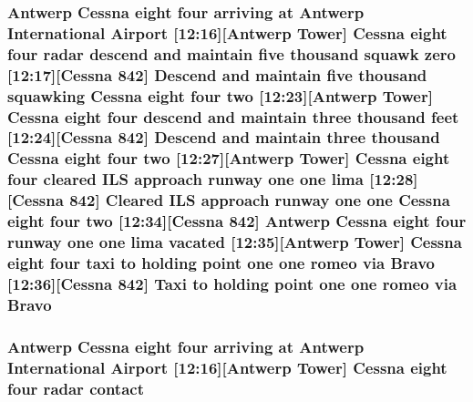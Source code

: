 \subsubsection[{\texorpdfstring{Bravo}{Bravo}}]{\setlength{\rightskip}{0pt plus 5cm}Antwerp {\bf Cessna} eight four arriving at Antwerp International {\bf Airport} \mbox{[}12\+:16\mbox{]}\mbox{[}Antwerp {\bf Tower}\mbox{]} {\bf Cessna} eight four radar descend and maintain five {\bf thousand} squawk {\bf zero} \mbox{[}12\+:17\mbox{]}\mbox{[}{\bf Cessna} 842\mbox{]} Descend and maintain five {\bf thousand} {\bf squawking} {\bf Cessna} eight four {\bf two} \mbox{[}12\+:23\mbox{]}\mbox{[}Antwerp {\bf Tower}\mbox{]} {\bf Cessna} eight four descend and maintain three {\bf thousand} {\bf feet} \mbox{[}12\+:24\mbox{]}\mbox{[}{\bf Cessna} 842\mbox{]} Descend and maintain three {\bf thousand} {\bf Cessna} eight four {\bf two} \mbox{[}12\+:27\mbox{]}\mbox{[}Antwerp {\bf Tower}\mbox{]} {\bf Cessna} eight four cleared I\+LS approach runway {\bf one} {\bf one} {\bf lima} \mbox{[}12\+:28\mbox{]}\mbox{[}{\bf Cessna} 842\mbox{]} Cleared I\+LS approach runway {\bf one} {\bf one} {\bf Cessna} eight four {\bf two} \mbox{[}12\+:34\mbox{]}\mbox{[}{\bf Cessna} 842\mbox{]} Antwerp {\bf Cessna} eight four runway {\bf one} {\bf one} {\bf lima} vacated \mbox{[}12\+:35\mbox{]}\mbox{[}Antwerp {\bf Tower}\mbox{]} {\bf Cessna} eight four taxi to holding point {\bf one} {\bf one} {\bf romeo} via Bravo \mbox{[}12\+:36\mbox{]}\mbox{[}{\bf Cessna} 842\mbox{]} Taxi to holding point {\bf one} {\bf one} {\bf romeo} via Bravo}\hypertarget{happyDay2ATC_8txt_acb3d304c3ed17a69007f1a5f35b55c6f}{}\label{happyDay2ATC_8txt_acb3d304c3ed17a69007f1a5f35b55c6f}
\subsubsection[{\texorpdfstring{contact}{contact}}]{\setlength{\rightskip}{0pt plus 5cm}Antwerp {\bf Cessna} eight four arriving at Antwerp International {\bf Airport} \mbox{[}12\+:16\mbox{]}\mbox{[}Antwerp {\bf Tower}\mbox{]} {\bf Cessna} eight four radar contact}\hypertarget{happyDay2ATC_8txt_aabccce409c3b74e74ea0c068d4a73f10}{}\label{happyDay2ATC_8txt_aabccce409c3b74e74ea0c068d4a73f10}
